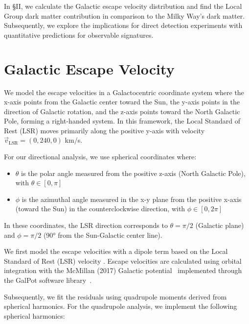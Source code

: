 \documentclass[%
 reprint,
 amsmath,amssymb,
 aps,
]{revtex4-2}
\begin{document}
In \S II, we calculate the Galactic escape velocity distribution and find the Local Group dark matter contribution in comparison to the Milky Way's dark matter. Subsequently, we explore the implications for direct detection experiments with quantitative predictions for observable signatures.


\section{Galactic Escape Velocity}
\label{sec:methodology}



We model the escape velocities in a Galactocentric coordinate system where the x-axis points from the Galactic center toward the Sun, the y-axis points in the direction of Galactic rotation, and the z-axis points toward the North Galactic Pole, forming a right-handed system. In this framework, the Local Standard of Rest (LSR) moves primarily along the positive y-axis with velocity $\vec{v}_{\text{LSR}} = (0, 240, 0)$ km/s\cite{Schoenrich2010}.

For our directional analysis, we use spherical coordinates where:
\begin{itemize}
    \item $\theta$ is the polar angle measured from the positive z-axis (North Galactic Pole), with $\theta \in [0, \pi]$
    \item $\phi$ is the azimuthal angle measured in the x-y plane from the positive x-axis (toward the Sun) in the counterclockwise direction, with $\phi \in [0, 2\pi]$
\end{itemize}

In these coordinates, the LSR direction corresponds to $\theta = \pi/2$ (Galactic plane) and $\phi = \pi/2$ (90° from the Sun-Galactic center line).

We first model the escape velocities with a dipole term based on the Local Standard of Rest (LSR) velocity \cite{Schoenrich2010}. Escape velocities are calculated using orbital integration with the McMillan (2017) Galactic potential~\cite{McMillan2017} implemented through the GalPot software library~\cite{McMillan2017}.

Subsequently, we fit the residuals using quadrupole moments derived from spherical harmonics. For the quadrupole analysis, we implement the following spherical harmonics:
\end{document}
